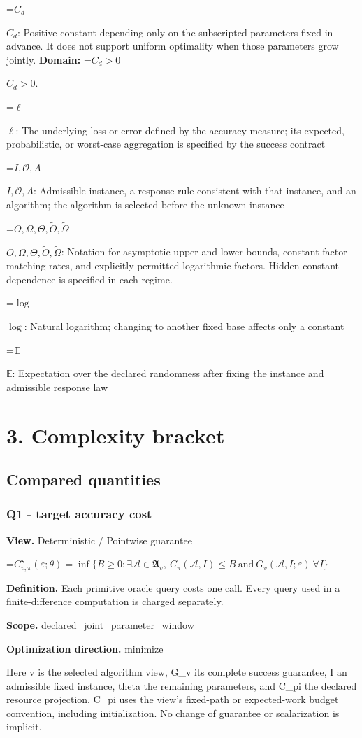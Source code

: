\documentclass[10pt,a4paper]{article}
\newcommand{\AtlasMath}[1]{\par\begingroup\centering\setbox0=\hbox{$\displaystyle #1$}\ifdim\wd0>1.4\linewidth\typeout{ATLAS WIDE FORMULA: \the\wd0}\fi\ifdim\wd0>\linewidth\resizebox{\linewidth}{!}{\box0}\else\box0\fi\par\endgroup}
\newcommand{\AtlasInlineMath}[1]{\begingroup\setbox0=\hbox{$#1$}\ifdim\wd0>.4\linewidth\endgroup\AtlasMath{#1}\else\endgroup$#1$\fi}
\begin{document}
\AtlasInlineMath{C_d}: Positive constant depending only on the subscripted parameters fixed in advance. It does not support uniform optimality when those parameters grow jointly. \textbf{Domain:} \AtlasInlineMath{C_d>0}.

\AtlasInlineMath{\ell}: The underlying loss or error defined by the accuracy measure; its expected, probabilistic, or worst-case aggregation is specified by the success contract

\AtlasInlineMath{I,\mathcal{O},A}: Admissible instance, a response rule consistent with that instance, and an algorithm; the algorithm is selected before the unknown instance

\AtlasInlineMath{O,\Omega,\Theta,\widetilde{O},\widetilde\Omega}: Notation for asymptotic upper and lower bounds, constant-factor matching rates, and explicitly permitted logarithmic factors. Hidden-constant dependence is specified in each regime.

\AtlasInlineMath{\log}: Natural logarithm; changing to another fixed base affects only a constant

\AtlasInlineMath{\mathbb{E}}: Expectation over the declared randomness after fixing the instance and admissible response law

\section{3. Complexity bracket}
\subsection{Compared quantities}
\subsubsection{Q1 - target accuracy cost}
\textbf{View.} Deterministic / Pointwise guarantee

\AtlasMath{C^\star_{v,\pi}(\varepsilon;\theta)=\inf\{B\ge0:\exists\mathcal A\in\mathfrak A_v,\ C_\pi(\mathcal A,I)\le B\ \text{and}\ G_v(\mathcal A,I;\varepsilon)\ \forall I\}}
\textbf{Definition.} Each primitive oracle query costs one call. Every query used in a finite-difference computation is charged separately.

\textbf{Scope.} declared\_joint\_parameter\_window

\textbf{Optimization direction.} minimize

Here v is the selected algorithm view, G\_v its complete success guarantee, I an admissible fixed instance, theta the remaining parameters, and C\_pi the declared resource projection. C\_pi uses the view's fixed-path or expected-work budget convention, including initialization. No change of guarantee or scalarization is implicit.
\end{document}
